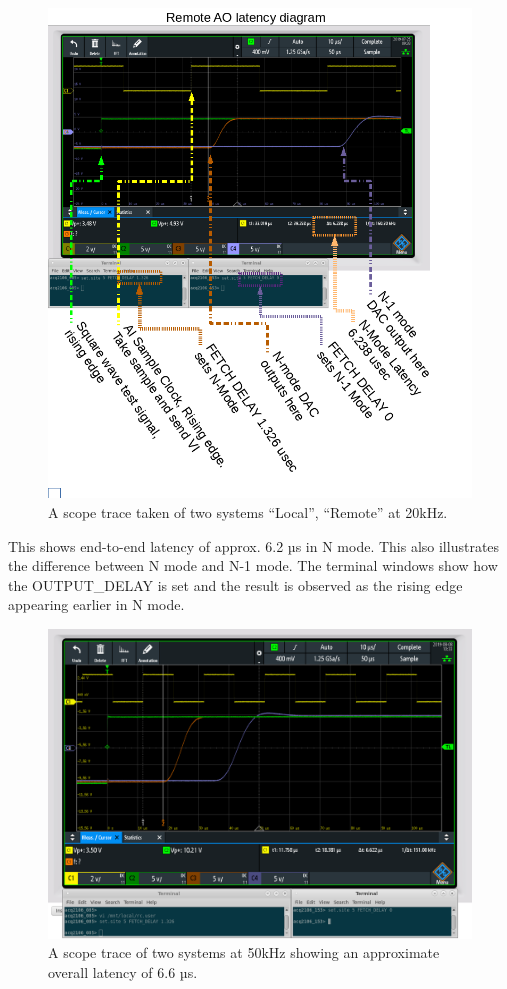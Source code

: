 \documentclass{article}
\begin{document}
\begin{figure}
	\centering
	\includegraphics[width=5.0in]{images/20kHz_annotated_scope.png}
	\caption{A scope trace taken of two systems “Local”, “Remote” at 20kHz.}
	\label{}
\end{figure}

This shows end-to-end latency of  approx. 6.2 µs in N mode. 
This also illustrates the difference between N mode and N-1 mode.
The terminal windows show how the OUTPUT\_DELAY is set and the result is observed as the rising edge appearing earlier in N mode.

\begin{figure}
	\centering
	\includegraphics[width=5.0in]{images/50kHz_annotated_scope.png}
	\caption{A scope trace of two systems at 50kHz showing an approximate overall latency of 6.6 µs.}
	\label{}
\end{figure}
\end{document}

